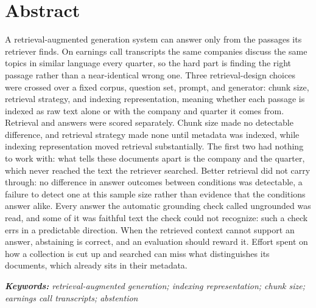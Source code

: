 \chapter*{Abstract}

\noindent
A retrieval-augmented generation system can answer only from the passages its
retriever finds. On earnings call transcripts the same companies discuss the same
topics in similar language every quarter, so the hard part is finding the right
passage rather than a near-identical wrong one. Three retrieval-design choices were crossed over a fixed corpus,
question set, prompt, and generator: chunk size, retrieval strategy, and
indexing representation, meaning whether each passage is indexed as raw text
alone or with the company and quarter it comes from. Retrieval
and answers were scored separately. Chunk size made no detectable difference,
and retrieval strategy made none until metadata was indexed, while indexing
representation moved retrieval substantially. The first two had nothing to
work with: what tells these documents apart is the company and the quarter,
which never reached the text the retriever searched. Better retrieval did not
carry through: no difference in answer outcomes between conditions was
detectable, a failure to detect one at this sample size rather than evidence
that the conditions answer alike. Every answer the
automatic grounding check called ungrounded was read, and some of it was
faithful text the check could not recognize: such a check errs in a predictable
direction. When the retrieved context cannot support an answer,
abstaining is correct, and an evaluation should reward it. Effort spent on
how a collection is cut up and searched can miss what distinguishes its
documents, which already sits in their metadata.

\vspace{1em}
\noindent
\textit{\textbf{Keywords: }retrieval-augmented generation; indexing
representation; chunk size; earnings call transcripts; abstention}
